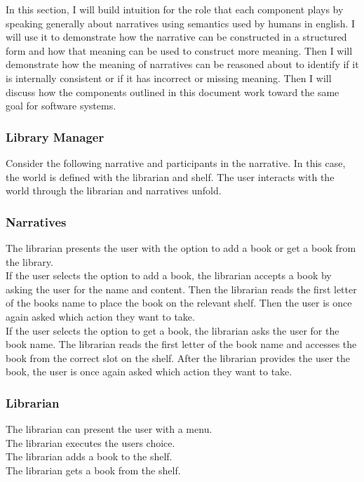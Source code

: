 In this section, I will build intuition for the role that each component plays by speaking generally about narratives using semantics used by humans in english. I will use it to demonstrate how the narrative can be constructed in a structured form and how that meaning can be used to construct more meaning. Then I will demonstrate how the meaning of narratives can be reasoned about to identify if it is internally consistent or if it has incorrect or missing meaning. Then I will discuss how the components outlined in this document work toward the same goal for software systems. 

\subsubsection{Library Manager}

Consider the following narrative and participants in the narrative. In this case, the world is defined with the librarian and shelf. The user interacts with the world through the librarian and narratives unfold. 

\subsubsection*{Narratives}
\begin{greyquote}
    The librarian presents the user with the option to add a book or get a book from the library.\\

    If the user selects the option to add a book, the librarian accepts a book by asking the user for the name and content. Then the librarian reads the first letter of the books name to place the book on the relevant shelf. Then the user is once again asked which action they want to take.\\

    If the user selects the option to get a book, the librarian asks the user for the book name. The librarian reads the first letter of the book name and accesses the book from the correct slot on the shelf. After the librarian provides the user the book, the user is once again asked which action they want to take.
\end{greyquote}

\subsubsection*{Librarian}
\begin{greyquote}
    The librarian can present the user with a menu. \\
    The librarian executes the users choice.\\
    The librarian adds a book to the shelf.\\
    The librarian gets a book from the shelf.
\end{greyquote}

